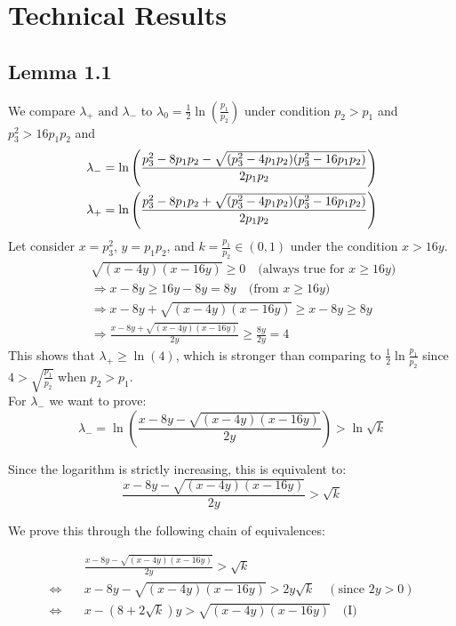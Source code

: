 \documentclass[a4paper, 10pt]{article}
\newcommand{\bea}{\begin{eqnarray}}
\newcommand{\eea}{\end{eqnarray}}
\theoremstyle{definition}
\begin{document}
\newpage
\section*{Technical Results}
\subsection*{Lemma 1.1}\label{AppendixLemma}
We compare $\lambda_+ \text{ and } \lambda_-$ to  $\lambda_0 = \frac{1}{2}\ln(\frac{p_1}{p_2})$ under condition $p_2 > p_1$ and $p_3^2>16p_1p_2$ and 
\bea \lambda_{-}= \ln\left(\frac{p_3^2-8p_1p_2 - \sqrt{(p_3^2-4p_1p_2)(p_3^2-16p_1p_2)}}{2p_1p_2}\right) \cr \lambda_{+} =\ln\left(\frac{p_3^2-8p_1p_2 +  \sqrt{(p_3^2-4p_1p_2)(p_3^2-16p_1p_2)}}{2p_1p_2}\right) \eea
Let consider $x = p_3^2$, $y = p_1p_2$, and $k = \frac{p_1}{p_2} \in (0,1)$ under the condition $x>16y$.\\

\begin{align*}
& \quad \sqrt{(x-4y)(x-16y)} \geq 0 \quad \text{(always true for } x \geq 16y\text{)} \\
& \quad \Longrightarrow x - 8y \geq 16y - 8y = 8y \quad \text{(from } x \geq 16y\text{)} \\
& \quad \Longrightarrow x - 8y + \sqrt{(x-4y)(x-16y)} \geq x - 8y \geq 8y \\
& \quad \Longrightarrow \frac{x - 8y + \sqrt{(x-4y)(x-16y)}}{2y} \geq \frac{8y}{2y} = 4
\end{align*}
This shows that $\lambda_+ \geq \ln(4)$, which is stronger than comparing to $\frac{1}{2}\ln \frac{p_1}{p_2}$ since $4 > \sqrt{\frac{p_1}{p_2}}$ when $p_2 > p_1$.\\
For $\lambda_-$ we want to prove:
\[
\lambda_- = \ln\left(\frac{x - 8y - \sqrt{(x-4y)(x-16y)}}{2y}\right) > \ln \sqrt{k}
\]

Since the logarithm is strictly increasing, this is equivalent to:
\[
\frac{x - 8y - \sqrt{(x-4y)(x-16y)}}{2y} > \sqrt{k}
\]

We prove this through the following chain of equivalences:

\begin{align*}
&\frac{x - 8y - \sqrt{(x-4y)(x-16y)}}{2y} > \sqrt{k} \\
\Leftrightarrow\quad & x - 8y - \sqrt{(x-4y)(x-16y)} > 2y\sqrt{k} \quad (\text{since } 2y > 0) \\
\Leftrightarrow\quad & x - (8 + 2\sqrt{k})y > \sqrt{(x-4y)(x-16y)} \quad \text{(I)}
\end{align*}
\end{document}
